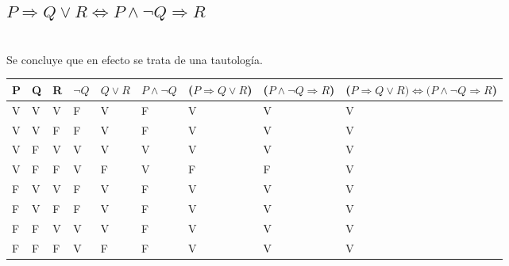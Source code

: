 \documentclass[12pt]{article}
\begin{document}
\begin{center}
\section*{$P\Rightarrow Q \vee R \Leftrightarrow P \wedge \lnot  Q\Rightarrow R$ } 
\end{center}\\

Se concluye que en efecto se trata de una tautología.
\begin{table}
\centering
\begin{tabular}{|l|l|l|l|l|l|l|l|l|} 
\hline
P & Q & R & $\lnot  Q$ & $Q \vee R$ & $P \wedge \lnot  Q$ & ($P\Rightarrow Q \vee R$) & ($P \wedge \lnot  Q\Rightarrow R$) & ($P\Rightarrow Q \vee R) \Leftrightarrow (P \wedge \lnot  Q\Rightarrow R$)  \\ 
\hline
V & V & V &  F  &  V     &  F      &        V          &        V           &             V                                          \\ 
\hline
V & V & F &  F  &  V     &  F      &        V          &        V           &           V                                            \\ 
\hline
V & F & V &  V  &  V     &   V     &       V           &         V          &            V                                           \\ 
\hline
V & F & F &   V & F      &  V      &        F          &        F           &           V                                            \\ 
\hline
F & V & V & F   & V      &  F      &        V          &        V           &           V                                            \\ 
\hline
F & V & F & F   & V      & F       &        V          &        V           &           V                                            \\ 
\hline
F & F & V & V   & V      & F       &        V          &    V               &           V                                            \\ 
\hline
F & F & F &  V  &  F     & F       &        V          &    V               &           V                                            \\
\hline
\end{tabular}
\end{table}
\end{document}
